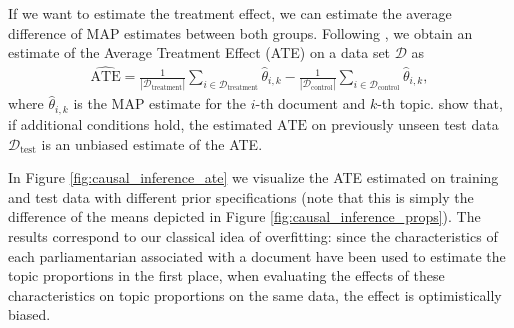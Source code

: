 If we want to estimate the treatment effect, we can estimate the average difference of MAP estimates between both groups. Following \cite{egami2018make}, we obtain an estimate of the Average Treatment Effect (ATE) on a data set $\mathcal{D}$ as 
\begin{align}
\widehat{\text{ATE}} = \frac{1}{|\mathcal{D}_{\text{treatment}}|}\sum_{i \in \mathcal{D}_{\text{treatment}}} \hat{\theta}_{i,k} - \frac{1}{|\mathcal{D}_{\text{control}}|}\sum_{i \in \mathcal{D}_{\text{control}}} \hat{\theta}_{i,k},
\end{align} 
where $\hat{\theta}_{i,k}$ is the MAP estimate for the $i$-th document and $k$-th topic. \cite{egami2018make} show that, if additional conditions hold, the estimated $\widehat{\text{ATE}}$ on previously unseen test data $\mathcal{D}_{\text{test}}$ is an unbiased estimate of the ATE.

In Figure \ref{fig:causal_inference_ate} we visualize the ATE estimated on training and test data with different prior specifications (note that this is simply the difference of the means depicted in Figure \ref{fig:causal_inference_props}). The results correspond to our classical idea of overfitting: since the characteristics of each parliamentarian associated with a document have been used to estimate the topic proportions in the first place, when evaluating the effects of these characteristics on topic proportions on the same data, the effect is optimistically biased.

